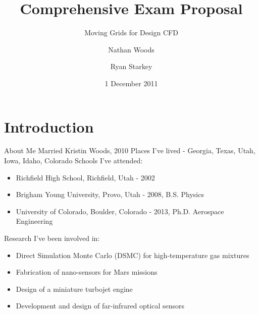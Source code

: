 \documentclass{beamer}
\title[] %
{Comprehensive Exam Proposal}
\subtitle
{Moving Grids for Design CFD}
\author[C. Nathan Woods, R. Starkey] %
{Nathan Woods \and Ryan Starkey}
\institute[CU-Boulder] %
{
  Busemann Advanced Concepts Laboratory\\
  Department of Aerospace Engineering Sciences\\
  University of Colorado at Boulder}
\date[] %
{1 December 2011}
\begin{document}
\begin{frame}
  \titlepage
\end{frame}






\section{Introduction}

\begin{frame}{About Me}
  Married Kristin Woods, 2010
  Places I've lived - Georgia, Texas, Utah, Iowa, Idaho, Colorado
  Schools I've attended:
  \begin{itemize}
  \item Richfield High School, Richfield, Utah - 2002
  \item Brigham Young University, Provo, Utah -  2008, B.S. Physics
  \item University of Colorado, Boulder, Colorado -  2013, Ph.D. Aerospace Engineering
  \end{itemize}
  Research I've been involved in:
    \begin{itemize}
    \item Direct Simulation Monte Carlo (DSMC) for high-temperature
      gas mixtures
    \item Fabrication of nano-sensors for Mars missions
    \item Design of a miniature turbojet engine
    \item Development and design of far-infrared optical sensors
    \end{itemize}
\end{frame}
\end{document}
